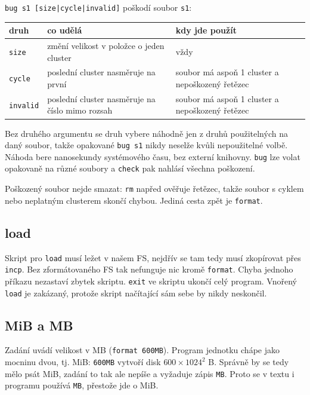 \documentclass[10pt, a4paper]{report}
\newcommand{\code}[1]{\texttt{#1}}
\begin{document}
	\code{bug s1 [size|cycle|invalid]} poškodí soubor \code{s1}:
	
	\begin{table}[H]
		\centering
		\begin{tabular}{|l|p{5.5cm}|p{5cm}|}
			\hline
			\textbf{druh} & \textbf{co udělá} & \textbf{kdy jde použít} \\ \hline
			\code{size} & změní velikost v položce o jeden cluster & vždy \\ \hline
			\code{cycle} & poslední cluster nasměruje na první & soubor má aspoň 1 cluster a nepoškozený řetězec \\ \hline
			\code{invalid} & poslední cluster nasměruje na číslo mimo rozsah & soubor má aspoň 1 cluster a nepoškozený řetězec \\ \hline
		\end{tabular}
	\end{table}
	
	Bez druhého argumentu se druh vybere náhodně jen z druhů použitelných na daný soubor, takže
	opakované \code{bug s1} nikdy neselže kvůli nepoužitelné volbě. Náhoda bere nanosekundy
	systémového času, bez externí knihovny. \code{bug} lze volat opakovaně na různé soubory a
	\code{check} pak nahlásí všechna poškození.
	
	Poškozený soubor nejde smazat: \code{rm} napřed ověřuje řetězec, takže soubor s cyklem nebo
	neplatným clusterem skončí chybou. Jediná cesta zpět je \code{format}.
	
	\subsection{load}
	
	Skript pro \code{load} musí ležet v našem FS, nejdřív se tam tedy musí zkopírovat přes
	\code{incp}. Bez zformátovaného FS tak nefunguje nic kromě \code{format}. Chyba jednoho
	příkazu nezastaví zbytek skriptu. \code{exit} ve skriptu ukončí celý program. Vnořený
	\code{load} je zakázaný, protože skript načítající sám sebe by nikdy neskončil.
	
	\subsection{MiB a MB}
	
	Zadání uvádí velikost v MB (\code{format 600MB}). Program jednotku chápe jako mocninu dvou,
	tj. MiB: \code{600MB} vytvoří disk $600 \times 1024^2$ B. Správně by se tedy mělo psát MiB,
	zadání to tak ale nepíše a vyžaduje zápis \code{MB}. Proto se v textu i programu používá
	\code{MB}, přestože jde o MiB.
	
\end{document}
